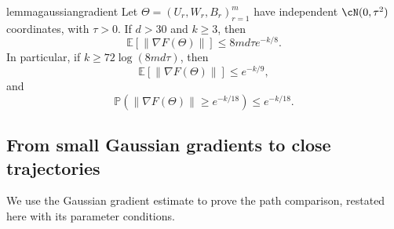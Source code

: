 \documentclass[11pt,twoside]{article}
\newcommand{\E}{\mathbb E}
\renewcommand{\P}{\mathbb P}
\theoremstyle{definition}
\theoremstyle{remark}
\begin{document}
\begin{restatable}{lemma}{gaussiangradient}
\label{lem:gaussian-gradient}
Let $\Theta=(U_r,W_r,B_r)_{r=1}^m$ have independent
$\cN(0,\tau^2)$ coordinates, with $\tau>0$. If $d>30$ and $k\ge3$, then
\begin{equation}
\E[\|\nabla F(\Theta)\|]\le8md\tau e^{-k/8}.
\label{eq:gaussian-gradient-general}
\end{equation}
In particular, if $k\ge72\log(8md\tau)$, then
\begin{equation}
\E[\|\nabla F(\Theta)\|]\le e^{-k/9},
\label{eq:expected-gradient}
\end{equation}
and
\begin{equation}
\P(\|\nabla F(\Theta)\|\ge e^{-k/18})\le e^{-k/18}.
\label{eq:gradient-tail}
\end{equation}
\end{restatable}

\subsection{From small Gaussian gradients to close trajectories}

We use the Gaussian gradient estimate to prove the path comparison, restated
here with its parameter conditions.
\pathcomparison*
\end{document}
